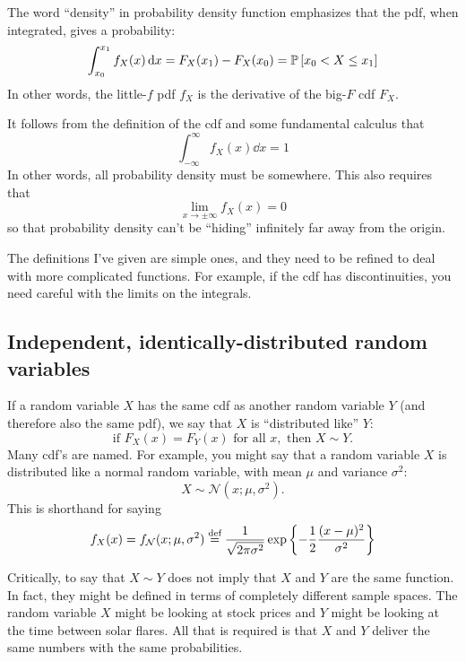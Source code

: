 The word ``density'' in probability density function emphasizes that the pdf,
when integrated, gives a probability:
\begin{equation*}\label{eq:integrated_pdf}
\int_{x_0}^{x_1} f_X(x) \, \mathrm{d} x = F_X(x_1) - F_X(x_0) = \mathbb{P}\left[{x_0 < X \leq x_1}\right]
\end{equation*}
In other words, the little-$f$ pdf $f_X$ is the derivative of the big-$F$ cdf
$F_X$.

It follows from the definition of the cdf and
some fundamental calculus that
\begin{equation*}
\int_{-\infty}^\infty f_X(x) \dd x = 1
\end{equation*}
In other words, all probability density must be somewhere. This also requires that
\begin{equation*}
\lim_{x \to \pm \infty} f_X(x) = 0
\end{equation*}
so that probability density can't be ``hiding'' infinitely far away from the origin.

The definitions I've given are simple ones, and they need to be refined to
deal with more complicated functions. For example, if the cdf has
discontinuities, you need careful with the limits on the integrals.

\subsection{Independent, identically-distributed random variables}

If a random variable $X$ has the same cdf as another random variable $Y$ (and
therefore also the same pdf), we say that $X$ is ``distributed like'' $Y$:
$$
\text{if } F_X(x) = F_Y(x) \text{ for all } x, \text{ then } X \sim Y.
$$
Many cdf's are named. For example, you might say that a random variable $X$ is distributed like a normal random variable, with mean $\mu$ and variance $\sigma^2$:
$$
X \sim \mathcal{N}(x; \mu, \sigma^2).
$$
This is shorthand for saying
\begin{equation*}
f_X(x) = f_\mathcal{N}(x; \mu, \sigma^2) \stackrel{\text{def}}{=}
  \frac{1}{\sqrt{2\pi\sigma^2}} \exp \left\{-\frac{1}{2} \frac{(x-\mu)^2}{\sigma^2} \right\}
\end{equation*}

Critically, to say that $X \sim Y$ does not imply that $X$ and $Y$ are the same
function. In fact, they might
be defined in terms of completely different sample spaces. The random variable
$X$ might be looking at stock prices and $Y$ might be looking at the time between
solar flares. All that is required is that $X$ and $Y$ deliver the same numbers
with the same probabilities.

